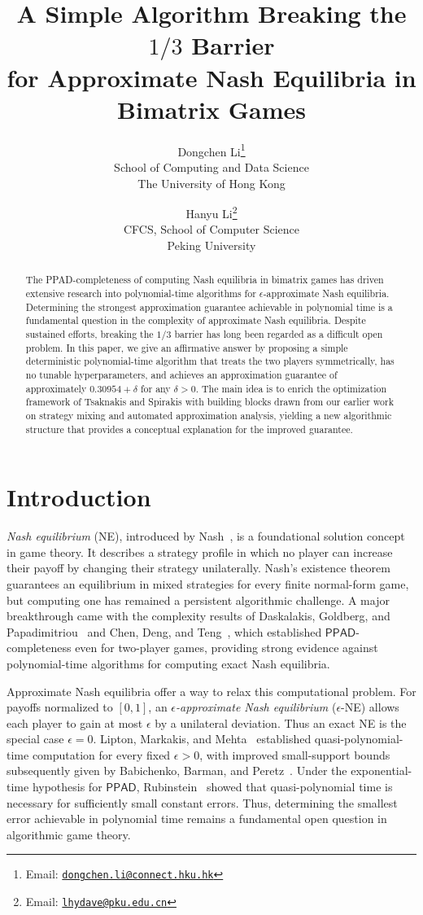 \documentclass[11pt]{article}
\title{A Simple Algorithm Breaking the $1/3$ Barrier\\
for Approximate Nash Equilibria in Bimatrix Games}
\author{
  Dongchen Li\thanks{Email: \href{mailto:dongchen.li@connect.hku.hk}{\texttt{dongchen.li@connect.hku.hk}}}\\
  {\small School of Computing and Data Science}\\
  {\small The University of Hong Kong}
  \and
  Hanyu Li\thanks{Email: \href{mailto:lhydave@pku.edu.cn}{\texttt{lhydave@pku.edu.cn}}}\\
  {\small CFCS, School of Computer Science}\\
  {\small Peking University}
}
\date{}
\theoremstyle{remark}
\theoremstyle{plain}
\begin{document}
\maketitle

\begin{abstract}
The PPAD-completeness of computing Nash equilibria in bimatrix games
has driven extensive research into polynomial-time algorithms
for $\epsilon$-approximate Nash equilibria.
Determining the strongest approximation guarantee achievable in
polynomial time is a fundamental question in the complexity of
approximate Nash equilibria.
Despite sustained efforts, breaking the $1/3$ barrier has long been
regarded as a difficult open problem.
In this paper, we give an affirmative answer by proposing a simple
deterministic polynomial-time algorithm that treats the two players
symmetrically, has no tunable hyperparameters, and achieves an
approximation guarantee of approximately $0.30954+\delta$ for any
$\delta>0$.
The main idea is to enrich the optimization framework of Tsaknakis
and Spirakis with building blocks drawn from our earlier work on strategy
mixing and automated approximation analysis, yielding a new algorithmic
structure that provides a conceptual explanation for the improved
guarantee.
\end{abstract}

\section{Introduction}
\label{sec:introduction}

\emph{Nash equilibrium} (NE), introduced by Nash~\cite{nash1951}, is a foundational
solution concept in game theory. It describes a strategy profile in which no
player can increase their payoff by changing their strategy unilaterally.
Nash's existence theorem guarantees an equilibrium in mixed strategies for
every finite normal-form game, but computing one has remained a persistent algorithmic
challenge. A major breakthrough came with the complexity results of Daskalakis, Goldberg, and
Papadimitriou~\cite{daskalakis2009} and Chen, Deng, and Teng~\cite{chen2009},
which established $\mathsf{PPAD}$-completeness even for two-player games,
providing strong evidence against polynomial-time algorithms for computing
exact Nash equilibria.

Approximate Nash equilibria offer a way to relax this computational problem.
For payoffs normalized to $[0,1]$, an \emph{$\epsilon$-approximate Nash equilibrium}
($\epsilon$-NE) allows each player to gain at most $\epsilon$ by a unilateral
deviation. Thus an exact NE is the special case $\epsilon=0$.
Lipton, Markakis, and Mehta~\cite{lipton2003} established
quasi-polynomial-time computation for every fixed $\epsilon>0$, with improved
small-support bounds subsequently given by Babichenko, Barman, and
Peretz~\cite{babichenko2017}. Under the exponential-time hypothesis for
$\mathsf{PPAD}$, Rubinstein~\cite{rubinstein2016} showed that
quasi-polynomial time is necessary for sufficiently small constant errors.
Thus, determining the smallest error achievable in
polynomial time remains a fundamental open question in algorithmic game
theory.
\end{document}
